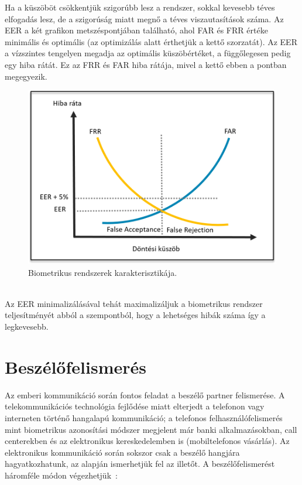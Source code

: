 \newline
\newline
Ha a küszöböt csökkentjük szigorúbb lesz a rendszer, sokkal kevesebb téves elfogadás lesz, de a szigorúság miatt megnő a téves viszautasítások száma.
\newline
\newline
Az EER a két grafikon metszéspontjában található, ahol FAR és FRR értéke minimális és optimális (az optimizálás alatt érthetjük a kettő szorzatát). Az EER a vízszintes tengelyen megadja az optimális küszöbértéket, a függőlegesen pedig egy hiba rátát. Ez az FRR és FAR hiba rátája, mivel a kettő ebben a pontban megegyezik.

\begin{figure}[!ht]
	\centering
	\includegraphics[width=150mm, keepaspectratio]{figures/eer.png}
	\caption{Biometrikus rendszerek karakterisztikája.}
	\label{fig:eer}
\end{figure}
\ \\
Az EER minimalizálásával tehát maximalizáljuk a biometrikus rendszer teljesítményét abból a szempontból, hogy a lehetséges hibák száma így a legkevesebb.
\newpage
\section{Beszélőfelismerés}

Az emberi kommunikáció során fontos feladat a beszélő partner felismerése. A telekommunikációs technológia fejlődése miatt elterjedt a telefonon vagy interneten történő hangalapú kommunikáció; a telefonos felhasználófelismerés mint biometrikus azonosítási módszer megjelent már banki alkalmazásokban, call centerekben és az elektronikus kereskedelemben is (mobiltelefonos vásárlás). Az elektronikus kommunikáció során sokszor csak a beszélő hangjára hagyatkozhatunk, az alapján ismerhetjük fel az illetőt. A beszélőfelismerést háromféle módon végezhetjük~\cite{taufiq_2015}:

